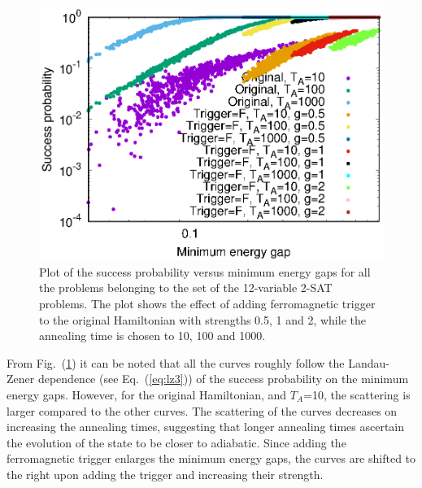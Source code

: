 \documentclass[../main.tex]{subfiles}
\begin{document}
\begin{figure}[H]
\centering
\includegraphics[scale=0.8]{SuccVsGap_OF_g.eps}
\caption{Plot of the success probability versus minimum energy gaps for all the problems belonging to the set of the 12-variable 2-SAT problems. The plot shows the effect of adding ferromagnetic trigger to the original Hamiltonian with strengths 0.5, 1 and 2, while the annealing time is chosen to 10, 100 and 1000.}
\label{fig:f14}
\end{figure} 

From Fig.~(\ref{fig:f14}) it can be noted that all the curves roughly follow the Landau-Zener dependence (see Eq.~(\ref{eq:lz3})) of the success probability on the minimum energy gaps. However, for the original Hamiltonian, and $T_A$=10, the scattering is larger compared to the other curves. The scattering of the curves decreases on increasing the annealing times, suggesting that longer annealing times ascertain the evolution of the state to be closer to adiabatic. Since adding the ferromagnetic trigger enlarges the minimum energy gaps, the curves are shifted to the right upon adding the trigger and increasing their strength. 
\end{document}
